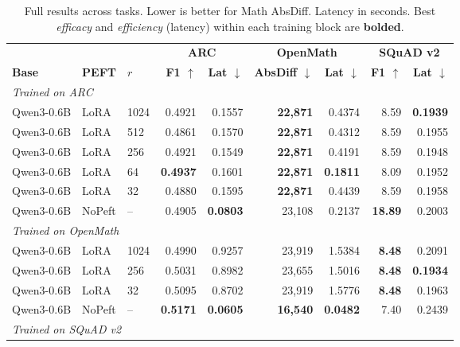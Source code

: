 \documentclass[11pt,a4paper]{article}
\begin{document}
\begin{table}[H]
\centering
\caption{Full results across tasks. Lower is better for Math AbsDiff. Latency in seconds. Best \emph{efficacy} and \emph{efficiency} (latency) within each training block are \textbf{bolded}.}
\label{tab:full}
\footnotesize
\begin{adjustbox}{max width=\textwidth}
\begin{tabular}{lllrrrrrr}
\toprule
 & & & \multicolumn{2}{c}{\textbf{ARC}} & \multicolumn{2}{c}{\textbf{OpenMath}} & \multicolumn{2}{c}{\textbf{SQuAD v2}} \\
\cmidrule(lr){4-5}\cmidrule(lr){6-7}\cmidrule(lr){8-9}
\textbf{Base} & \textbf{PEFT} & \textbf{$r$} & \textbf{F1 $\uparrow$} & \textbf{Lat $\downarrow$} & \textbf{AbsDiff $\downarrow$} & \textbf{Lat $\downarrow$} & \textbf{F1 $\uparrow$} & \textbf{Lat $\downarrow$} \\
\midrule
\multicolumn{9}{l}{\textit{Trained on ARC}} \\
Qwen3-0.6B & LoRA   & 1024 & 0.4921 & 0.1557 & \textbf{22{,}871} & 0.4374 & 8.59 & \textbf{0.1939} \\
Qwen3-0.6B & LoRA   & 512  & 0.4861 & 0.1570 & \textbf{22{,}871} & 0.4312 & 8.59 & 0.1955 \\
Qwen3-0.6B & LoRA   & 256  & 0.4921 & 0.1549 & \textbf{22{,}871} & 0.4191 & 8.59 & 0.1948 \\
Qwen3-0.6B & LoRA   & 64   & \textbf{0.4937} & 0.1601 & \textbf{22{,}871} & \textbf{0.1811} & 8.09 & 0.1952 \\
Qwen3-0.6B & LoRA   & 32   & 0.4880 & 0.1595 & \textbf{22{,}871} & 0.4439 & 8.59 & 0.1958 \\
Qwen3-0.6B & NoPeft & --   & 0.4905 & \textbf{0.0803} & 23{,}108 & 0.2137 & \textbf{18.89} & 0.2003 \\
\midrule
\multicolumn{9}{l}{\textit{Trained on OpenMath}} \\
Qwen3-0.6B & LoRA   & 1024 & 0.4990 & 0.9257 & 23{,}919 & 1.5384 & \textbf{8.48} & 0.2091 \\
Qwen3-0.6B & LoRA   & 256  & 0.5031 & 0.8982 & 23{,}655 & 1.5016 & \textbf{8.48} & \textbf{0.1934} \\
Qwen3-0.6B & LoRA   & 32   & 0.5095 & 0.8702 & 23{,}919 & 1.5776 & \textbf{8.48} & 0.1963 \\
Qwen3-0.6B & NoPeft & --   & \textbf{0.5171} & \textbf{0.0605} & \textbf{16{,}540} & \textbf{0.0482} & 7.40 & 0.2439 \\
\midrule
\multicolumn{9}{l}{\textit{Trained on SQuAD v2}} \\

\end{tabular}
\end{adjustbox}
\end{table}
\end{document}
